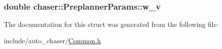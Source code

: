 \subsubsection[{\texorpdfstring{w\+\_\+v}{w_v}}]{\setlength{\rightskip}{0pt plus 5cm}double chaser\+::\+Preplanner\+Params\+::w\+\_\+v}\hypertarget{structchaser_1_1_preplanner_params_a1778793e5b16806c867291c1a5471a04}{}\label{structchaser_1_1_preplanner_params_a1778793e5b16806c867291c1a5471a04}


The documentation for this struct was generated from the following file\+:\begin{DoxyCompactItemize}
\item 
include/auto\+\_\+chaser/\hyperlink{_common_8h}{Common.\+h}\end{DoxyCompactItemize}
